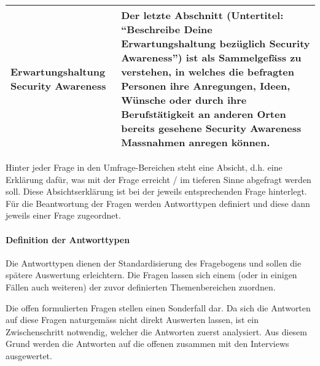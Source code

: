 \documentclass[../../main.tex]{subfiles}
\begin{document}
\begin{table}[H]
\begin{tabular}{ |p{3cm}|p{12.5cm}|}
\hline
\textbf{Erwartungshaltung \newline Security Awareness}                &  Der letzte Abschnitt (Untertitel: "`Beschreibe Deine Erwartungshaltung bezüglich Security Awareness"') ist als Sammelgefäss zu verstehen, in welches die befragten Personen ihre Anregungen, Ideen, Wünsche oder durch ihre Berufstätigkeit an anderen Orten bereits gesehene Security Awareness Massnahmen anregen können. \\
\hline

\end{tabular}
\end{table}

\begin{sloppypar}

Hinter jeder Frage in den Umfrage-Bereichen steht eine Absicht, d.h. eine Erklärung dafür, was mit der Frage erreicht / im tieferen Sinne abgefragt werden soll. Diese Absichtserklärung ist bei der jeweils entsprechenden Frage hinterlegt. Für die Beantwortung der Fragen werden Antworttypen definiert und diese dann jeweils einer Frage zugeordnet.

\end{sloppypar}


\paragraph*{Definition der Antworttypen}\mbox{}

\begin{sloppypar}
Die Antworttypen dienen der Standardisierung des Fragebogens und sollen die spätere Auswertung erleichtern. Die Fragen lassen sich einem (oder in einigen Fällen auch weiteren) der zuvor definierten Themenbereichen zuordnen.

Die offen formulierten Fragen stellen einen Sonderfall dar. Da sich die Antworten auf diese Fragen naturgemäss nicht direkt Auswerten lassen, ist ein Zwischenschritt notwendig, welcher die Antworten zuerst analysiert. Aus diesem Grund werden die Antworten auf die offenen zusammen mit den Interviews ausgewertet\footnotemark.

\end{sloppypar}



\sloppy 
\end{document}
